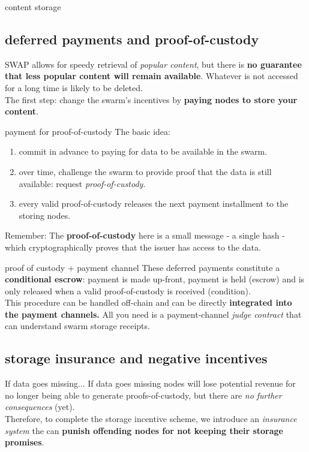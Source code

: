 \documentclass{beamer}
\begin{document}
\begin{section}{content storage}
\subsection[pay-as-you-store]{deferred payments and proof-of-custody}
\begin{frame}{}
SWAP allows for speedy retrieval of \emph{popular content}, but there is \textbf{no guarantee that less popular content will remain available}. Whatever is not accessed for a long time is likely to be deleted.\\[5mm]
The first step: change the swarm's incentives by \textbf{paying nodes to store your content}.
\end{frame}
\begin{frame}{payment for proof-of-custody}
The basic idea:
\begin{enumerate}
 \item commit in advance to paying for data to be available in the swarm.
 \item over time, challenge the swarm to provide proof that the data is still available: request \emph{proof-of-custody}.
 \item every valid proof-of-custody releases the next payment installment to the storing nodes.
\end{enumerate}
\begin{block}{Remember:}
 The \textbf{proof-of-custody} here is a small message - a single hash - which cryptographically proves that the issuer has access to the data.
\end{block}
\end{frame}
\begin{frame}{proof of custody + payment channel}
 These deferred payments  constitute a \textbf{conditional escrow}: payment is made up-front, payment is held (escrow) and is only released when a valid proof-of-custody is received (condition).\\[5mm]
 This procedure can be handled off-chain and can be directly \textbf{integrated into the payment channels.} All you need is a payment-channel \emph{judge contract} that can understand swarm storage receipts.
\end{frame}


\subsection[insurance]{storage insurance and negative incentives}
\begin{frame}{If data goes missing...}
 If data goes missing nodes will lose potential revenue for no longer being able to generate proofs-of-custody, but there are \emph{no further consequences} (yet). \\[5mm]
 Therefore, to complete the storage incentive scheme, we introduce an \emph{insurance system} the can \textbf{punish offending nodes for not keeping their storage promises}.
\end{frame}


\end{section}
\end{document}
